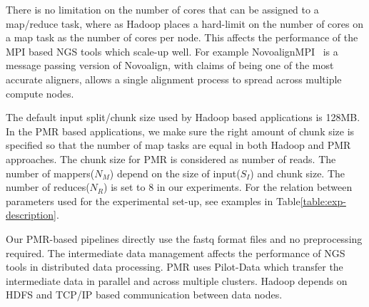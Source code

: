 \documentclass{acm_proc_article-sp}
\begin{document}
There is no limitation on the number of cores that can be assigned to
a map/reduce task, where as Hadoop places a hard-limit on the number
of cores on a map task as the number of cores per node.   This affects
the performance of the MPI based NGS tools which scale-up well. For
example NovoalignMPI~\cite{novo-align} is a message passing version of
Novoalign, with claims of being one of the most accurate aligners,
allows a single alignment process to spread across multiple compute
nodes.

The default input split/chunk size used by Hadoop based applications
is 128MB. In the PMR based applications, we make sure the right amount
of chunk size is specified so that the number of map tasks are equal
in both Hadoop and PMR approaches. The chunk size for PMR is
considered as number of reads. The number of mappers($N_M$) depend on
the size of input($S_I$) and chunk size. The number of reduces($N_R$)
is set to 8 in our experiments. For the relation between parameters
used for the experimental set-up, see examples in
Table\ref{table:exp-description}.

Our PMR-based pipelines directly use the fastq format files and no
preprocessing required.  The intermediate data management affects the
performance of NGS tools in distributed data processing. PMR uses
Pilot-Data which transfer the intermediate data in parallel and across
multiple clusters. Hadoop depends on HDFS and TCP/IP based
communication between data nodes.


\end{document}
